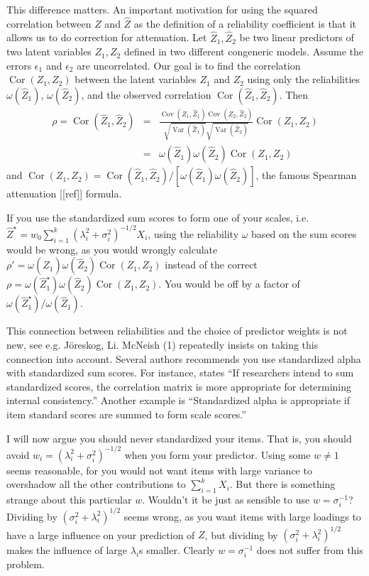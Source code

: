 \documentclass{article}
\theoremstyle{plain}
\theoremstyle{plain}
\theoremstyle{definition}
\theoremstyle{remark}
\theoremstyle{definition}
\theoremstyle{plain}
\theoremstyle{plain}
\theoremstyle{definition}
\DeclareMathOperator{\Var}{Var}
\DeclareMathOperator{\Cor}{Cor}
\DeclareMathOperator{\Cov}{Cov}
\begin{document}
This difference matters. An important motivation for using the squared
correlation between $Z$ and $\widehat{Z}$ as the definition of a
reliability coefficient is that it allows us to do correction for
attenuation. Let $\widehat{Z}_{1},\widehat{Z}_{2}$ be two linear
predictors of two latent variables $Z_{1},Z_{2}$ defined in two different
congeneric models. Assume the errors $\epsilon_{1}$ and $\epsilon_{2}$
are uncorrelated. Our goal is to find the correlation $\Cor(Z_{1},Z_{2})$
between the latent variables $Z_{1}$ and $Z_{2}$ using only the
reliabilities $\omega(\widehat{Z}_{1})$, $\omega(\widehat{Z}_{2})$,
and the observed correlation $\Cor(\widehat{Z}_{1},\widehat{Z}_{2})$.
Then
\begin{eqnarray*}
\rho=\Cor(\widehat{Z}_{1},\widehat{Z}_{2}) & = & \frac{\Cov(Z_{1},\widehat{Z}_{1})\Cov(Z_{2},\widehat{Z}_{2})}{\sqrt{\Var(\widehat{Z}_{1})}\sqrt{\Var(\widehat{Z}_{2})}}\Cor(Z_{1},Z_{2})\\
 & = & \omega(\widehat{Z}_{1})\omega(\widehat{Z}_{2})\Cor(Z_{1},Z_{2})
\end{eqnarray*}
and $\Cor(Z_{1},Z_{2})=\Cor(\widehat{Z}_{1},\widehat{Z}_{2})/\left[\omega(\widehat{Z}_{1})\omega(\widehat{Z}_{2})\right]$,
the famous Spearman attenuation {[}{[}ref{]}{]} formula.

If you use the standardized sum scores to form one of your scales,
i.e. $\widehat{Z}^{\star}=w_{0}\sum_{i=1}^{k}(\lambda_{i}^{2}+\sigma_{i}^{2})^{-1/2}X_{i}$,
using the reliability $\omega$ based on the sum scores would be wrong,
as you would wrongly calculate $\rho'=\omega(\widehat{Z}_{1})\omega(\widehat{Z}_{2})\Cor(Z_{1},Z_{2})$
instead of the correct $\rho=\omega(\widehat{Z}_{1}^{\star})\omega(\widehat{Z}_{2})\Cor(Z_{1},Z_{2})$.
You would be off by a factor of $\omega(\widehat{Z}_{1}^{\star})/\omega(\widehat{Z}_{1})$.

This connection between reliabilities and the choice of predictor
weights is not new, see e.g. Jöreskog, Li. McNeish (1) repeatedly
insists on taking this connection into account. Several authors recommends you use standardized alpha with standardized sum scores. For instance, \citet[][p.451]{Falk2011-ae} states \enquote{If researchers intend to sum
standardized scores, the correlation matrix is more appropriate for determining internal consistency.} Another example is \citet[][p.99]{Cortina1993-aq} \enquote{Standardized alpha is appropriate if item standard scores are summed to form scale scores.}

I will now argue you should never standardized your items. That is, you should avoid $w_{i}=(\lambda_{i}^{2}+\sigma_{i}^{2})^{-1/2}$ when you form your predictor.
Using some $w\ne1$ seems reasonable, for you would not want items
with large variance to overshadow all the other contributions to $\sum_{i=1}^{k}X_{i}$.
But there is something strange about this particular $w$. Wouldn't
it be just as sensible to use $w=\sigma_{i}^{-1}$? Dividing by $\left(\sigma_{i}^{2}+\lambda_{i}^{2}\right)^{1/2}$
seems wrong, as you want items with large loadings to have a large
influence on your prediction of $Z$, but dividing by $\left(\sigma_{i}^{2}+\lambda_{i}^{2}\right)^{1/2}$
makes the influence of large $\lambda_{i}$s smaller. Clearly $w=\sigma_{i}^{-1}$
does not suffer from this problem.
\end{document}
